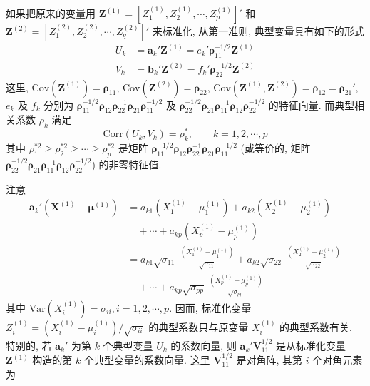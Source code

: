 如果把原来的变量用 $\mathbf{Z}^{(1)}=[Z_1^{(1)},Z_2^{(1)},\cdots,Z_p^{(1)}]'$ 和 $\mathbf{Z}^{(2)}=[Z_1^{(2)},Z_2^{(2)},\cdots,Z_q^{(2)}]'$ 来标准化, 从第一准则, 典型变量具有如下的形式
\label{eq:10-8}
\begin{equation}
\begin{aligned}
U_k&=\mathbf{a}_k'\mathbf{Z}^{(1)}=e_k'\boldsymbol{\rho}_{11}^{-1/2}\mathbf{Z}^{(1)}\\
V_k&=\mathbf{b}_k'\mathbf{Z}^{(2)}=f_k'\boldsymbol{\rho}_{22}^{-1/2}\mathbf{Z}^{(2)}
\end{aligned}
\tag{10-8}
\end{equation}
这里, $\mathrm{Cov}(\mathbf{Z}^{(1)})=\boldsymbol{\rho}_{11}$, $\mathrm{Cov}(\mathbf{Z}^{(2)})=\boldsymbol{\rho}_{22}$, $\mathrm{Cov}(\mathbf{Z}^{(1)},\mathbf{Z}^{(2)})=\boldsymbol{\rho}_{12}=\boldsymbol{\rho}_{21}'$, $e_k$ 及 $f_k$ 分别为 $\boldsymbol{\rho}_{11}^{-1/2}\boldsymbol{\rho}_{12}\boldsymbol{\rho}_{22}^{-1}\boldsymbol{\rho}_{21}\boldsymbol{\rho}_{11}^{-1/2}$ 及 $\boldsymbol{\rho}_{22}^{-1/2}\boldsymbol{\rho}_{21}\boldsymbol{\rho}_{11}^{-1}\boldsymbol{\rho}_{12}\boldsymbol{\rho}_{22}^{-1/2}$ 的特征向量. 而典型相关系数 $\rho_k$ 满足
\label{eq:10-9}
\begin{equation}
\mathrm{Corr}(U_k,V_k)=\rho_k^*,\qquad k=1,2,\cdots,p
\tag{10-9}
\end{equation}
其中 $\rho_1^{*2}\ge\rho_2^{*2}\ge\cdots\ge\rho_p^{*2}$ 是矩阵 $\boldsymbol{\rho}_{11}^{-1/2}\boldsymbol{\rho}_{12}\boldsymbol{\rho}_{22}^{-1}\boldsymbol{\rho}_{21}\boldsymbol{\rho}_{11}^{-1/2}$ (或等价的, 矩阵 $\boldsymbol{\rho}_{22}^{-1/2}\boldsymbol{\rho}_{21}\boldsymbol{\rho}_{11}^{-1}\boldsymbol{\rho}_{12}\boldsymbol{\rho}_{22}^{-1/2}$) 的非零特征值.

\noindent{}\quad 注意
\[
\begin{aligned}
\mathbf{a}_k'(\mathbf{X}^{(1)}-\boldsymbol{\mu}^{(1)})&=a_{k1}(X_1^{(1)}-\mu_1^{(1)})+a_{k2}(X_2^{(1)}-\mu_2^{(1)})\\
&\quad+\cdots+a_{kp}(X_p^{(1)}-\mu_p^{(1)})\\
&=a_{k1}\sqrt{\sigma_{11}}\ \frac{(X_1^{(1)}-\mu_1^{(1)})}{\sqrt{\sigma_{11}}}+a_{k2}\sqrt{\sigma_{22}}\ \frac{(X_2^{(1)}-\mu_2^{(1)})}{\sqrt{\sigma_{22}}}\\
&\quad+\cdots+a_{kp}\sqrt{\sigma_{pp}}\ \frac{(X_p^{(1)}-\mu_p^{(1)})}{\sqrt{\sigma_{pp}}}
\end{aligned}
\]
其中 $\mathrm{Var}(X_i^{(1)})=\sigma_{ii}, i=1,2,\cdots,p$. 因而, 标准化变量 $Z_i^{(1)}=(X_i^{(1)}-\mu_i^{(1)})/\sqrt{\sigma_{ii}}$ 的典型系数只与原变量 $X_i^{(1)}$ 的典型系数有关. 特别的, 若 $\mathbf{a}_k'$ 为第 $k$ 个典型变量 $U_k$ 的系数向量, 则 $\mathbf{a}_k'\mathbf{V}_{11}^{1/2}$ 是从标准化变量 $\mathbf{Z}^{(1)}$ 构造的第 $k$ 个典型变量的系数向量. 这里 $\mathbf{V}_{11}^{1/2}$ 是对角阵, 其第 $i$ 个对角元素为
